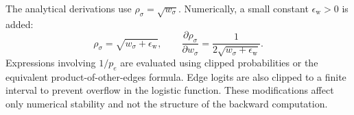 \documentclass[pdflatex,sn-mathphys-num]{sn-jnl}%
\theoremstyle{thmstyleone}%
\theoremstyle{thmstyletwo}%
\theoremstyle{thmstylethree}%
\begin{document}
\begin{appendices}
The analytical derivations use
\(\rho_\sigma=\sqrt{w_\sigma}\).
Numerically, a small constant \(\epsilon_{\mathrm w}>0\) is added:
\[
\rho_\sigma
=
\sqrt{w_\sigma+\epsilon_{\mathrm w}},
\qquad
\frac{\partial\rho_\sigma}{\partial w_\sigma}
=
\frac1{2\sqrt{w_\sigma+\epsilon_{\mathrm w}}}.
\]
Expressions involving \(1/p_e\) are evaluated using clipped probabilities or the equivalent product-of-other-edges formula. Edge logits are also clipped to a finite interval to prevent overflow in the logistic function. These modifications affect only numerical stability and not the structure of the backward computation.

\end{appendices}





\end{document}
